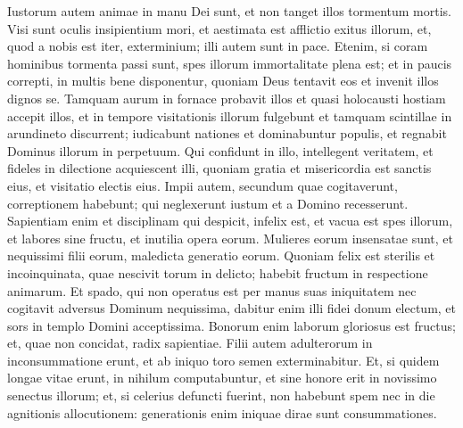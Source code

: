 \begin{biblechapter}  
\verse Iustorum autem animae in manu Dei sunt, et non tanget illos tormentum mortis. 
\verse Visi sunt oculis insipientium mori, et aestimata est afflictio exitus illorum, 
\verse et, quod a nobis est iter, exterminium; illi autem sunt in pace. 
\verse Etenim, si coram hominibus tormenta passi sunt, spes illorum immortalitate plena est; 
\verse et in paucis correpti, in multis bene disponentur, quoniam Deus tentavit eos et invenit illos dignos se. 
\verse Tamquam aurum in fornace probavit illos et quasi holocausti hostiam accepit illos, 
\verse et in tempore visitationis illorum fulgebunt et tamquam scintillae in arundineto discurrent; 
\verse iudicabunt nationes et dominabuntur populis, et regnabit Dominus illorum in perpetuum. 
\verse Qui confidunt in illo, intellegent veritatem, et fideles in dilectione acquiescent illi, quoniam gratia et misericordia est sanctis eius, et visitatio electis eius. 
\verse Impii autem, secundum quae cogitaverunt, correptionem habebunt; qui neglexerunt iustum et a Domino recesserunt. 
\verse Sapientiam enim et disciplinam qui despicit, infelix est, et vacua est spes illorum, et labores sine fructu, et inutilia opera eorum. 
\verse Mulieres eorum insensatae sunt, et nequissimi filii eorum, maledicta generatio eorum. 
\verse Quoniam felix est sterilis et incoinquinata, quae nescivit torum in delicto; habebit fructum in respectione animarum. 
\verse Et spado, qui non operatus est per manus suas iniquitatem nec cogitavit adversus Dominum nequissima, dabitur enim illi fidei donum electum, et sors in templo Domini acceptissima. 
\verse Bonorum enim laborum gloriosus est fructus; et, quae non concidat, radix sapientiae. 
\verse Filii autem adulterorum in inconsummatione erunt, et ab iniquo toro semen exterminabitur. 
\verse Et, si quidem longae vitae erunt, in nihilum computabuntur, et sine honore erit in novissimo senectus illorum; 
\verse et, si celerius defuncti fuerint, non habebunt spem nec in die agnitionis allocutionem: 
\verse generationis enim iniquae dirae sunt consummationes. 
\end{biblechapter}

